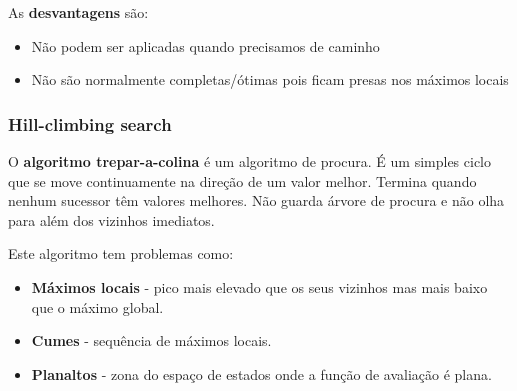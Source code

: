 \documentclass[11pt]{article}
\begin{document}
As \textbf{desvantagens} são:
\begin{itemize}[topsep=2pt,itemsep=0pt]
    \item Não podem ser aplicadas quando precisamos de caminho
    \item Não são normalmente completas/ótimas pois ficam presas nos máximos locais
\end{itemize}

\subsubsection{Hill-climbing search}

O \textbf{algoritmo trepar-a-colina} é um algoritmo de procura. É um simples ciclo que se move continuamente na direção de um valor melhor. Termina quando nenhum sucessor têm valores melhores. Não guarda árvore de procura e não olha para além dos vizinhos imediatos.\vspace{4pt}

Este algoritmo tem problemas como:
\begin{itemize}[topsep=2pt,itemsep=0pt]
    \item \textbf{Máximos locais} - pico mais elevado que os seus vizinhos mas mais baixo que o máximo global.
    \item \textbf{Cumes} - sequência de máximos locais.
    \item \textbf{Planaltos} - zona do espaço de estados onde a função de avaliação é plana.
\end{itemize}
\vspace{10pt}
\end{document}
